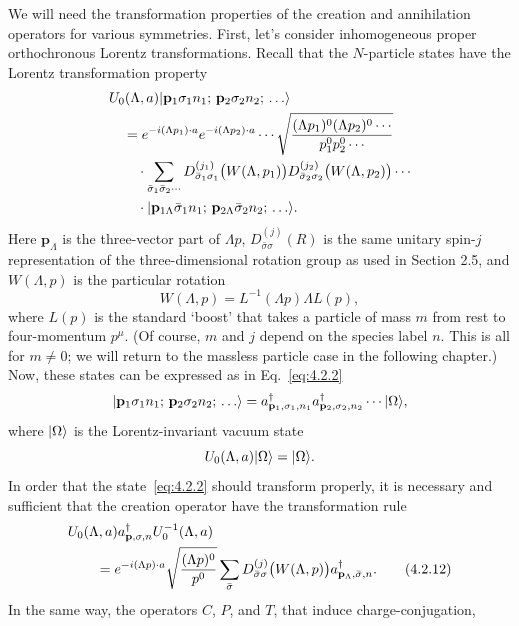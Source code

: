 We will need the transformation properties of the creation and annihilation
operators for various symmetries. First, let's consider inhomogeneous
proper orthochronous Lorentz transformations. Recall that the $N$-particle
states have the Lorentz transformation property
\begin{align*}
  &U_0(\Lambda,a)\lvert \mathbf p_1\sigma_1n_1;\,\mathbf p_2\sigma_2n_2;\,\ldots\rangle
  \\
  &\quad={}
  e^{-i(\Lambda p_1)\cdot a}e^{-i(\Lambda p_2)\cdot a}\cdots
  \sqrt{\frac{(\Lambda p_1)^0(\Lambda p_2)^0\cdots}{p_1^0p_2^0\cdots}}
  \notag\\
  &\qquad\cdot\sum_{\bar\sigma_1\bar\sigma_2\cdots}
  D_{\bar\sigma_1\sigma_1}^{(j_1)}\bigl(W(\Lambda,p_1)\bigr)
  D_{\bar\sigma_2\sigma_2}^{(j_2)}\bigl(W(\Lambda,p_2)\bigr)\cdots
  \notag\\
  &\qquad\cdot
  \lvert \mathbf p_{1\Lambda}\bar\sigma_1n_1;\,
       \mathbf p_{2\Lambda}\bar\sigma_2n_2;\,\ldots\rangle.
\end{align*}
Here $\mathbf p_\Lambda$ is the three-vector part of $\Lambda p$, $D_{\bar\sigma\sigma}^{(j)}(R)$ is the same unitary spin-$j$
representation of the three-dimensional rotation group as used in Section
2.5, and $W(\Lambda,p)$ is the particular rotation
\[
  W(\Lambda,p)=L^{-1}(\Lambda p)\Lambda L(p),
\]
where $L(p)$ is the standard `boost' that takes a particle of mass $m$ from rest
to four-momentum $p^\mu$. (Of course, $m$ and $j$ depend on the species label $n$.
This is all for $m\ne0$; we will return to the massless particle case in the
following chapter.) Now, these states can be expressed as in Eq.~\eqref{eq:4.2.2}
\[
  \lvert \mathbf p_1\sigma_1n_1;\,\mathbf p_2\sigma_2n_2;\,\ldots\rangle
  =a^\dagger_{\mathbf p_1,\sigma_1,n_1}a^\dagger_{\mathbf p_2,\sigma_2,n_2}\cdots
  \lvert \Omega\rangle,
\]
where $\lvert \Omega\rangle$ is the Lorentz-invariant vacuum state
\[
  U_0(\Lambda,a)\lvert \Omega\rangle=\lvert \Omega\rangle.
\]
In order that the state~\eqref{eq:4.2.2} should transform properly, it is necessary
and sufficient that the creation operator have the transformation rule
\begin{align}
  &U_0(\Lambda,a)a^\dagger_{\mathbf p,\sigma,n}U_0^{-1}(\Lambda,a)
  \notag\\
  &\qquad={}
  e^{-i(\Lambda p)\cdot a}\sqrt{\frac{(\Lambda p)^0}{p^0}}
  \sum_{\bar\sigma}D_{\bar\sigma\sigma}^{(j)}\bigl(W(\Lambda,p)\bigr)
  a^\dagger_{\mathbf p_\Lambda,\bar\sigma,n}.
  \tag{4.2.12}
  \label{eq:4.2.12}
\end{align}
In the same way, the operators $C$, $P$, and $T$, that induce charge-conjugation,
